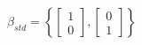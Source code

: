\documentclass[preview]{standalone}
\begin{document}
\begin{align*}
\beta_{std} = \left\{ \begin{bmatrix} 1 \\ 0 \end{bmatrix}, \begin{bmatrix} 0 \\ 1 \end{bmatrix} \right\}
\end{align*}
\end{document}
